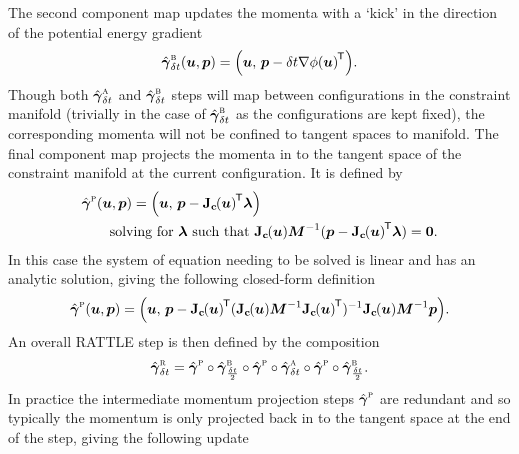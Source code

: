 The second component map updates the momenta with a `kick' in the direction of the potential energy gradient
\begin{equation}\label{eq:rattle-step-b}
  \hat{\cflowmap}^{\textsc{b}}_{\delta t}(\vct{u},\vct{p}) =
  \lpa \vct{u},\,\vct{p}-\delta t \grad{\phi}{\vct{u}}\tr \rpa.
\end{equation}
Though both $\hat{\boldsymbol{\gamma}}_{\delta t}^{\textsc{a}}$ and $\hat{\boldsymbol{\gamma}}^{\textsc{b}}_{\delta t}$ steps will map between configurations in the constraint manifold (trivially in the case of $\hat{\boldsymbol{\gamma}}^{\textsc{b}}_{\delta t}$ as the configurations are kept fixed), the corresponding momenta will not be confined to tangent spaces to manifold. The final component map projects the momenta in to the tangent space of the constraint manifold at the current configuration. It is defined by
\begin{equation}
\begin{split}
  &\hat{\cflowmap}^{\textsc{p}}(\vct{u},\vct{p}) =
  \lpa \vct{u},\,\vct{p}-\jacob{\vctfunc{c}}{\vct{u}}\tr\vct{\lambda}\rpa\\
  &\qquad\textrm{solving for}~\vct{\lambda}~\textrm{such that}~\jacob{\vctfunc{c}}{\vct{u}}\mtx{M}^{-1}(\vct{p}-\jacob{\vctfunc{c}}{\vct{u}}\tr\vct{\lambda}) = \vct{0}.
\end{split}
\end{equation}
In this case the system of equation needing to be solved is linear and has an analytic solution, giving the following closed-form definition
\begin{equation}\label{eq:rattle-step-p}
  \hat{\cflowmap}^{\textsc{p}}(\vct{u},\vct{p}) =
  \lpa \vct{u},\,\vct{p}-\jacob{\vctfunc{c}}{\vct{u}}\tr(\jacob{\vctfunc{c}}{\vct{u}}\mtx{M}^{-1}\jacob{\vctfunc{c}}{\vct{u}}\tr)^{-1}\jacob{\vctfunc{c}}{\vct{u}}\mtx{M}^{-1}\vct{p}\rpa.
\end{equation}
An overall RATTLE step is then defined by the composition
\begin{equation}\label{eq:rattle-ste}
  \hat{\boldsymbol{\gamma}}^{\textsc{r}}_{\delta t} =
  \hat{\boldsymbol{\gamma}}^{\textsc{p}} \circ
  \hat{\boldsymbol{\gamma}}^{\textsc{b}}_{\frac{\delta t}{2}} \circ
  \hat{\boldsymbol{\gamma}}^{\textsc{p}} \circ
  \hat{\boldsymbol{\gamma}}_{\delta t}^{\textsc{a}} \circ
  \hat{\boldsymbol{\gamma}}^{\textsc{p}} \circ
  \hat{\boldsymbol{\gamma}}^{\textsc{b}}_{\frac{\delta t}{2}}
  .
\end{equation}
In practice the intermediate momentum projection steps $\hat{\boldsymbol{\gamma}}^{\textsc{p}}$ are redundant \citep{mclachlan2014geometric} and so typically the momentum is only projected back in to the tangent space at the end of the step, giving the following update 

